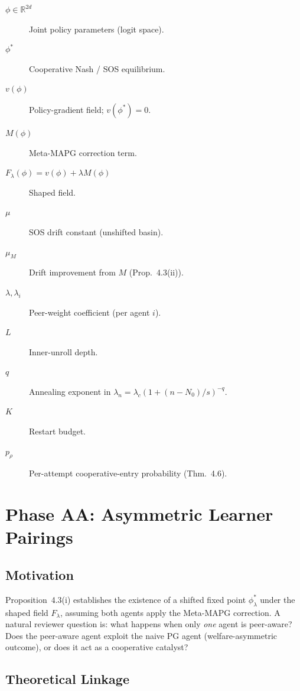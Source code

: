 \documentclass[11pt,a4paper]{article}
\begin{document}
\begin{description}
\item[$\phi\in\mathbb{R}^{2d}$] Joint policy parameters (logit space).
\item[$\phi^*$] Cooperative Nash / SOS equilibrium.
\item[$v(\phi)$] Policy-gradient field; $v(\phi^*)=0$.
\item[$M(\phi)$] Meta-MAPG correction term.
\item[$F_\lambda(\phi)=v(\phi)+\lambda M(\phi)$] Shaped field.
\item[$\mu$] SOS drift constant (unshifted basin).
\item[$\mu_M$] Drift improvement from $M$ (Prop.~4.3(ii)).
\item[$\lambda, \lambda_i$] Peer-weight coefficient (per agent $i$).
\item[$L$] Inner-unroll depth.
\item[$q$] Annealing exponent in $\lambda_n=\lambda_c(1+(n-N_0)/s)^{-q}$.
\item[$K$] Restart budget.
\item[$p_\rho$] Per-attempt cooperative-entry probability (Thm.~4.6).
\end{description}

\section{Phase AA: Asymmetric Learner Pairings}
\label{sec:aa}

\subsection{Motivation}

Proposition~4.3(i) establishes the existence of a shifted fixed point
$\phi^*_\lambda$ under the shaped field $F_\lambda$, assuming both agents
apply the Meta-MAPG correction. A natural reviewer question is: what
happens when only \emph{one} agent is peer-aware? Does the peer-aware agent
exploit the naive PG agent (welfare-asymmetric outcome), or does it act
as a cooperative catalyst?

\subsection{Theoretical Linkage}
\end{document}
